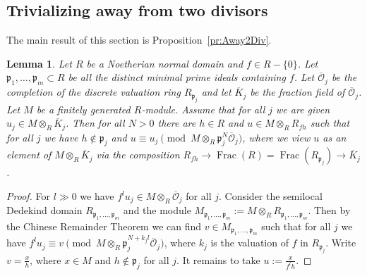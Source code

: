 \documentclass[11pt]{amsart}
\DeclareMathOperator{\Frac}{Frac}
\theoremstyle{plain}
\newtheorem{lemma}[proposition]{Lemma}
\theoremstyle{definition}
\theoremstyle{remark}
\newcommand\fp{{\mathfrak{p}}}
\newcommand\cO{{\mathcal{O}}}
\begin{document}
\subsection{Trivializing away from two divisors} The main result of this section is Proposition~\ref{pr:Away2Div}.
\begin{lemma}\label{lm:Approximation}
  Let $R$ be a Noetherian normal domain and $f\in R-\{0\}$. Let $\fp_1,\ldots,\fp_m\subset R$ be all the distinct minimal prime ideals containing $f$. Let $\overline\cO_j$ be the completion of the discrete valuation ring $R_{\fp_j}$ and let $\overline K_j$ be the fraction field of $\overline\cO_j$. Let $M$ be a finitely generated $R$-module. Assume that for all $j$ we are given $u_j\in M\otimes_R\overline K_j$. Then for all $N>0$ there are $h\in R$ and $u\in M\otimes_R R_{fh}$ such that for all $j$ we have $h\notin\fp_j$ and $u\equiv u_j\pmod{M\otimes_R\fp_j^N\overline\cO_j}$, where we view $u$ as an element of $M\otimes_R\overline K_j$ via the composition $R_{fh}\to\Frac(R)=\Frac(R_{\fp_j})\to\overline K_j$.
\end{lemma}
\begin{proof}
   For $l\gg0$ we have $f^lu_j\in M\otimes_R\overline\cO_j$ for all $j$. Consider the semilocal Dedekind domain $R_{\fp_1,\ldots,\fp_m}$ and the module $M_{\fp_1,\ldots,\fp_m}:=M\otimes_RR_{\fp_1,\ldots,\fp_m}$. Then by the Chinese Remainder Theorem we can find $v\in M_{\fp_1,\ldots,\fp_m}$ such that for all $j$ we have $f^lu_j\equiv v\pmod{M\otimes_R\fp_j^{N+k_jl}\overline\cO_j}$, where $k_j$ is the valuation of $f$ in $R_{\fp_j}$. Write $v=\frac xh$, where $x\in M$ and $h\notin\fp_j$ for all $j$. It remains to take $u:=\frac x{f^lh}$.
\end{proof}
\end{document}

